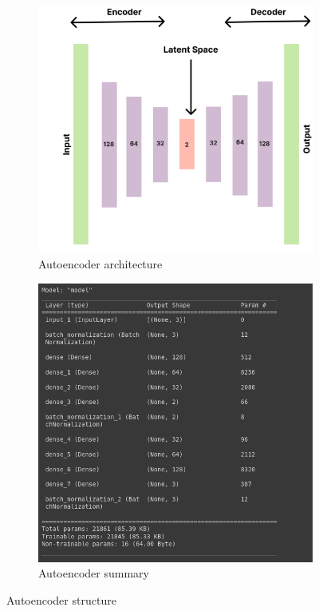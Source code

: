 \begin{itemize}
	      \begin{figure}[H]
	      	\centering
	      	\begin{subfigure}{0.5\textwidth}
	      		\includegraphics[width=\linewidth]{images/autoencoder_Architecture.png}
	      		\caption{Autoencoder architecture}
	      		\label{fig:autoencoder-architecture}
	      	\end{subfigure}
	      	\begin{subfigure}{0.5\textwidth}
	      		\includegraphics[width=\linewidth]{images/autoencoder_summary.png}
	      		\caption{Autoencoder summary}
	      		\label{fig:autoencoder-summary}
	      	\end{subfigure}
	      	\label{fig:autoencoder}
	      	\caption{Autoencoder structure}
	      \end{figure}
	      

\end{itemize}
